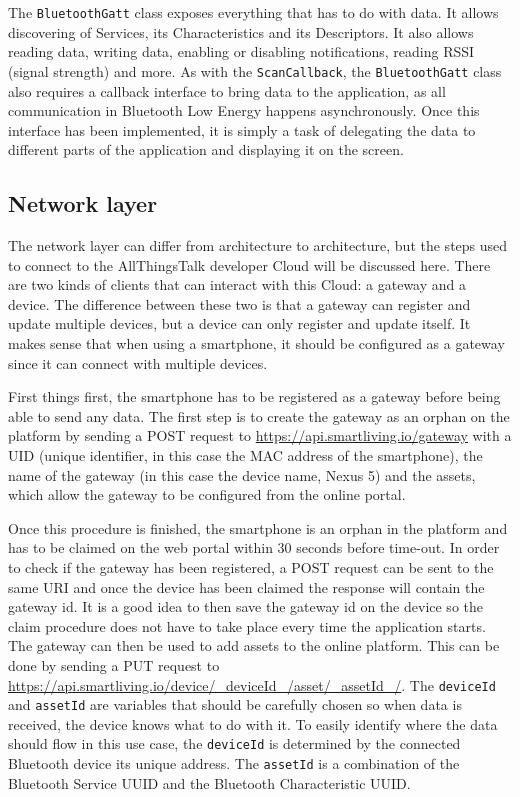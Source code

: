 \documentclass[pdftex,a4paper,12pt,twoside]{report}
\begin{document}
The \texttt{BluetoothGatt} class exposes everything that has to do with data. It allows discovering of Services, its Characteristics and its Descriptors. It also allows reading data, writing data, enabling or disabling notifications, reading RSSI (signal strength) and more. As with the \texttt{ScanCallback}, the \texttt{BluetoothGatt} class also requires a callback interface to bring data to the application, as all communication in Bluetooth Low Energy happens asynchronously. Once this interface has been implemented, it is simply a task of delegating the data to different parts of the application and displaying it on the screen.

\subsection{Network layer}
\label{subsec:networklayer}
The network layer can differ from architecture to architecture, but the steps used to connect to the AllThingsTalk developer Cloud will be discussed here. There are two kinds of clients that can interact with this Cloud: a gateway and a device. The difference between these two is that a gateway can register and update multiple devices, but a device can only register and update itself. It makes sense that when using a smartphone, it should be configured as a gateway since it can connect with multiple devices.

First things first, the smartphone has to be registered as a gateway before being able to send any data. The first step is to create the gateway as an orphan on the platform by sending a POST request to \url{https://api.smartliving.io/gateway} with a UID (unique identifier, in this case the MAC address of the smartphone), the name of the gateway (in this case the device name, Nexus 5) and the assets, which allow the gateway to be configured from the online portal.

Once this procedure is finished, the smartphone is an orphan in the platform and has to be claimed on the web portal within 30 seconds before time-out. In order to check if the gateway has been registered, a POST request can be sent to the same URI and once the device has been claimed the response will contain the gateway id. It is a good idea to then save the gateway id on the device so the claim procedure does not have to take place every time the application starts. The gateway can then be used to add assets to the online platform. This can be done by sending a PUT request to \url{https://api.smartliving.io/device/\_deviceId\_/asset/\_assetId\_/}. The \texttt{deviceId} and \texttt{assetId} are variables that should be carefully chosen so when data is received, the device knows what to do with it. To easily identify where the data should flow in this use case, the \texttt{deviceId} is determined by the connected Bluetooth device its unique address. The \texttt{assetId} is a combination of the Bluetooth Service UUID and the Bluetooth Characteristic UUID.
\end{document}
